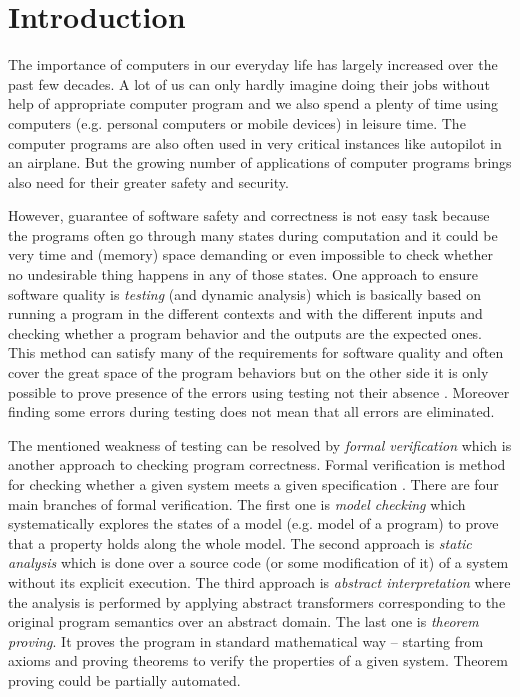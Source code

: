\chapter{Introduction}
The importance of computers in our everyday life has largely increased over the past few decades.
A lot of us can only hardly imagine doing their jobs without help of appropriate computer program
and we also spend a plenty of time using computers (e.g. personal computers or mobile devices) in leisure time.
The computer programs are also often used in very critical instances like autopilot in an airplane.
But the growing number of applications of computer programs brings also need for their greater safety and security.

However, guarantee of software safety and correctness is not easy task
because the programs often go through many states during computation
and it could be very time and (memory) space demanding or even impossible to check whether no undesirable thing
happens in any of those states.
One approach to ensure software quality is \emph{testing} (and dynamic analysis) which is basically based
on running a program in the different contexts and with the different inputs
and checking whether a program behavior and the outputs are the expected ones.
This method can satisfy many of the requirements for software quality and often cover the great space of the program behaviors
but on the other side it is only possible to prove presence of the errors using testing not their absence \cite{dijkstra}.
Moreover finding some errors during testing does not mean that all errors are eliminated.

The mentioned weakness of testing can be resolved by \emph{formal verification}
which is another approach to checking program correctness.
Formal verification is method for checking whether a given system meets a given specification \cite{fav:lecture}.
There are four main branches of formal verification.
The first one is \emph{model checking} which systematically explores the states of a model (e.g. model of a program) to
prove that a property holds along the whole model.
The second approach is \emph{static analysis} which is done over a source code (or some modification of it) of a system
without its explicit execution.
The third approach is \emph{abstract interpretation} where the analysis is performed by
applying abstract transformers corresponding to the original program semantics over an abstract domain.
The last one is \emph{theorem proving}.
It proves the program in standard mathematical way -- starting from axioms and proving theorems to
verify the properties of a given system.
Theorem proving could be partially automated.

